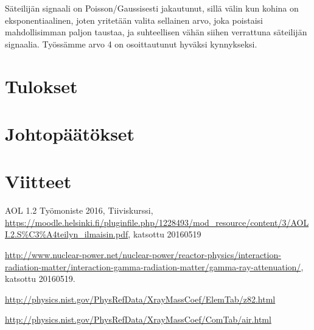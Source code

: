 \documentclass[a4paper, 12pt]{article}
\begin{document}
Säteilijän signaali on Poisson/Gaussisesti jakautunut, sillä välin kun kohina on eksponentiaalinen, joten yritetään valita sellainen arvo, joka poistaisi mahdollisimman paljon taustaa, ja suhteellisen vähän siihen verrattuna säteilijän signaalia. Työssämme arvo 4 on osoittautunut hyväksi kynnykseksi.

\section{Tulokset}



\section{Johtopäätökset}

\section{Viitteet}

\begin{thebibliography}{1}

 AOL 1.2 Työmoniste 2016, Tiiviskurssi, \url{https://moodle.helsinki.fi/pluginfile.php/1228493/mod_resource/content/3/AOLI.2.S%C3%A4teilyn_ilmaisin.pdf}, katsottu 20160519

 \url{http://www.nuclear-power.net/nuclear-power/reactor-physics/interaction-radiation-matter/interaction-gamma-radiation-matter/gamma-ray-attenuation/}, katsottu 20160519. 

 \url{http://physics.nist.gov/PhysRefData/XrayMassCoef/ElemTab/z82.html}

 \url{http://physics.nist.gov/PhysRefData/XrayMassCoef/ComTab/air.html}

\end{thebibliography}
\end{document}
